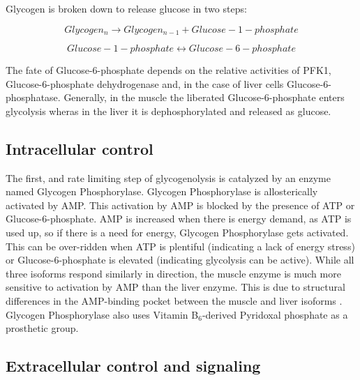 \documentclass{tufte-handout}
\begin{document}
Glycogen is broken down to release glucose in two steps:

\begin{equation}
Glycogen_{n} \rightarrow Glycogen_{n-1} + Glucose-1-phosphate
\end{equation}

\begin{equation}
Glucose-1-phosphate \leftrightarrow Glucose-6-phosphate
\end{equation}

The fate of Glucose-6-phosphate depends on the relative activities of PFK1, Glucose-6-phosphate dehydrogenase and, in the case of liver cells Glucose-6-phosphatase.  Generally, in the muscle the liberated Glucose-6-phosphate enters glycolysis wheras in the liver it is dephosphorylated and released as glucose.

\subsection{Intracellular control}

The first, and rate limiting step of glycogenolysis is catalyzed by an enzyme named Glycogen Phosphorylase.  Glycogen Phosphorylase is allosterically activated by AMP.  This activation by AMP is blocked by the presence of ATP or Glucose-6-phosphate.  AMP is increased when there is energy demand, as ATP is used up, so if there is a need for energy, Glycogen Phosphorylase gets activated.  This can be over-ridden when ATP is plentiful (indicating a lack of energy stress) or Glucose-6-phosphate is elevated (indicating glycolysis can be active).  While all three isoforms respond similarly in direction, the muscle enzyme is much more sensitive to activation by AMP than the liver enzyme.  This is due to structural differences in the AMP-binding pocket between the muscle and liver isoforms \citep{Rath2000}.  Glycogen Phosphorylase also uses Vitamin B$_6$-derived Pyridoxal phosphate as a prosthetic group.

\subsection{Extracellular control and signaling}
\end{document}
